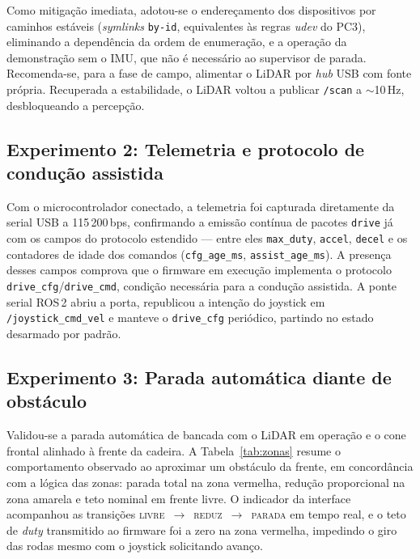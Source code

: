 \documentclass[conference]{IEEEtran}
\begin{document}
Como mitigação imediata, adotou-se o endereçamento dos dispositivos por
caminhos estáveis (\emph{symlinks} \texttt{by-id}, equivalentes às regras
\emph{udev} do PC3), eliminando a dependência da ordem de enumeração, e a
operação da demonstração sem o IMU, que não é necessário ao supervisor de
parada. Recomenda-se, para a fase de campo, alimentar o LiDAR por
\emph{hub} USB com fonte própria. Recuperada a estabilidade, o LiDAR voltou a
publicar \texttt{/scan} a $\sim$10\,Hz, desbloqueando a percepção.

\subsection{Experimento 2: Telemetria e protocolo de condução assistida}

Com o microcontrolador conectado, a telemetria foi capturada diretamente da
serial USB a 115\,200\,bps, confirmando a emissão contínua de pacotes
\texttt{drive} já com os campos do protocolo estendido --- entre eles
\texttt{max\_duty}, \texttt{accel}, \texttt{decel} e os contadores de idade dos
comandos (\texttt{cfg\_age\_ms}, \texttt{assist\_age\_ms}). A presença desses
campos comprova que o firmware em execução implementa o protocolo
\texttt{drive\_cfg}/\texttt{drive\_cmd}, condição necessária para a condução
assistida. A ponte serial ROS\,2 abriu a porta, republicou a intenção do
joystick em \texttt{/joystick\_cmd\_vel} e manteve o \texttt{drive\_cfg}
periódico, partindo no estado desarmado por padrão.

\subsection{Experimento 3: Parada automática diante de obstáculo}

Validou-se a parada automática de bancada com o LiDAR em operação e o cone
frontal alinhado à frente da cadeira. A Tabela~\ref{tab:zonas} resume o
comportamento observado ao aproximar um obstáculo da frente, em concordância
com a lógica das zonas: parada total na zona vermelha, redução proporcional na
zona amarela e teto nominal em frente livre. O indicador da interface
acompanhou as transições \textsc{livre}~$\rightarrow$~\textsc{reduz}~$\rightarrow$~\textsc{parada}
em tempo real, e o teto de \emph{duty} transmitido ao firmware foi a zero na
zona vermelha, impedindo o giro das rodas mesmo com o joystick solicitando
avanço.
\end{document}
